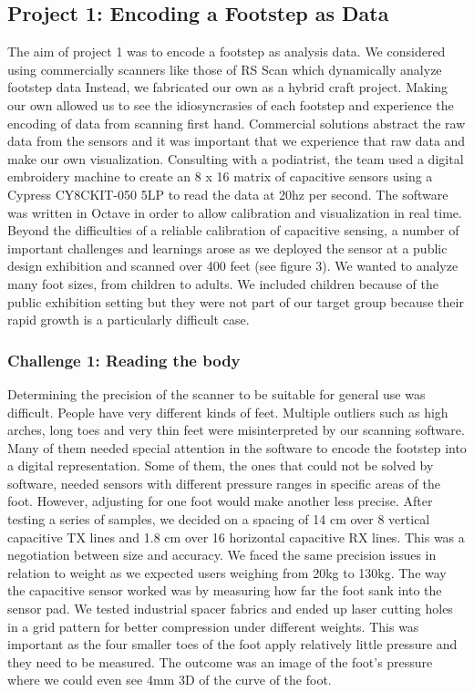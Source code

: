 \subsection{Project 1: Encoding a Footstep as Data}

The aim of project 1 was to encode a footstep as analysis data. We considered using commercially scanners like those of RS Scan which dynamically analyze footstep data \cite{Franklyn-Miller2014} Instead, we fabricated our own as a hybrid craft project. Making our own allowed us to see the idiosyncrasies of each footstep and experience the encoding of data from scanning first hand. Commercial solutions abstract the raw data from the sensors and it was important that we experience that raw data and make our own visualization.  
Consulting with a podiatrist, the team used a digital embroidery machine to create an 8 x 16 matrix of capacitive sensors using a Cypress CY8CKIT-050 5LP to read the data at 20hz per second. The software was written in Octave in order to allow calibration and visualization in real time. Beyond the difficulties of a reliable calibration of capacitive sensing, a number of important challenges and learnings arose as we deployed the sensor at a public design exhibition and scanned over 400 feet (see figure 3). We wanted to analyze many foot sizes, from children to adults. We included children because of the public exhibition setting but they were not part of our target group because their rapid growth is a particularly difficult case.


\subsubsection{Challenge 1: Reading the body}

Determining the precision of the scanner to be suitable for general use was difficult. People have very different kinds of feet. Multiple outliers such as high arches, long toes and very thin feet were misinterpreted by our scanning software. Many of them needed special attention in the software to encode the footstep into a digital representation.  Some of them, the ones that could not be solved by software, needed sensors with different pressure ranges in specific areas of the foot. However, adjusting for one foot would make another less precise.  
After testing a series of samples, we decided on a spacing of 14 cm over 8 vertical capacitive TX lines and 1.8 cm over 16 horizontal capacitive RX lines. This was a negotiation between size and accuracy. We faced the same precision issues in relation to weight as we expected users weighing from 20kg to 130kg. The way the capacitive sensor worked was by measuring how far the foot sank into the sensor pad.  We tested industrial spacer fabrics and ended up laser cutting holes in a grid pattern for better compression under different weights. This was important as the four smaller toes of the foot apply relatively little pressure and they need to be measured.  The outcome was an image of the foot's pressure where we could even see 4mm 3D of the curve of the foot. 


